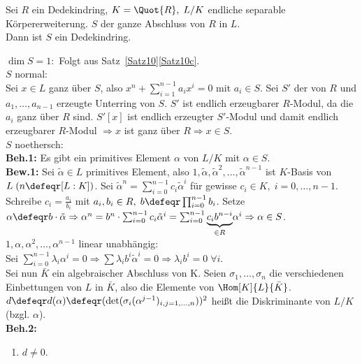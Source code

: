 \begin{Satz} 
Sei $R$ ein Dedekindring, $K = \Quot{R}, \; L/K$ endliche separable
Körpererweiterung.
$S$ der ganze Abschluss von $R$ in $L$.\\
Dann ist $S$ ein Dedekindring.
\end{Satz}

\begin{Bew} 
$\dim S=1:$ Folgt aus Satz~\ref{Satz10}\ref{Satz10c}.\\
$S$ normal:\\
Sei $x\in L$ ganz über $S$, also $x^n+\sum_{i=1}^{n-1}a_i x^i = 0$ mit $a_i \in S$.
Sei $S'$ der von $R$ und $a_1,\dots,a_{n-1}$ erzeugte Unterring von $S$.
$S'$ ist endlich erzeugbarer $R$-Modul, da die $a_i$ ganz über $R$ sind.
$S'[x]$ ist endlich erzeugter $S'$-Modul und damit endlich erzeugbarer $R$-Modul $\Rightarrow x$ ist ganz über $R \Rightarrow x \in S$.\\
$S$ noethersch:\\
\textbf{Beh.1:} Es gibt ein primitives Element $\alpha$ von $L/K$ mit $\alpha \in S$.\\
\textbf{Bew.1:} Sei $\tilde{\alpha} \in L$ primitives Element, also $1, \tilde{\alpha}, \tilde{\alpha}^2, \dots, \tilde{\alpha}^{n-1}$ ist $K$-Basis von $L \; (n \defeqr [L:K])$.
Sei $\tilde{\alpha}^n = \sum_{i=0}^{n-1} c_i \tilde{\alpha}^i$ für gewisse $c_i \in K, \; i = 0, \dots, n-1$.
Schreibe $c_i = \frac{a_i}{b_i}$ mit $a_i, b_i \in R, \; b \defeqr \prod_{i=0}^{n-1} b_i$.
Setze $\alpha \defeqr b \cdot \tilde{\alpha} \Rightarrow \alpha^n = b^n \cdot
\sum_{i=0}^{n-1} c_i \tilde{\alpha}^i = \sum_{i=0}^{n-1} \underset{\in
R}{\underbrace{c_i b^{n-i}}}\alpha^i \Rightarrow \alpha \in S$.\\
$1, \alpha, \alpha^2, \dots, \alpha^{n-1}$ linear unabhängig:\\
Sei $\sum_{i=0}^{n-1} \lambda_i \alpha^i = 0 \Rightarrow \sum \lambda_i b^i
\tilde{\alpha}^i = 0 \Rightarrow \lambda_i b^i = 0 \; \forall i$.\\
Sei nun $\bar{K}$ ein algebraischer Abschluss von K.
Seien $\sigma_1, \dots, \sigma_n$ die verschiedenen Einbettungen von $L$ in
$\bar{K}$, also die Elemente von $\Hom[K]{L}{\bar{K}}$.\\
$d \defeqr d(\alpha) \defeqr (\det(\sigma_i(\alpha^{j-1})_{i,j=1, \dots, n}))^2$
heißt die Diskriminante von $L/K$ (bzgl. $\alpha$).\\
\textbf{Beh.2:}
\begin{enumerate} 
  \item $d \not= 0$.

\end{enumerate}
\end{Bew}

